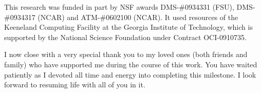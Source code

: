 \begin{acknowledgments}
This research was funded in part by NSF awards DMS-\#0934331 (FSU), DMS-\#0934317 (NCAR) and ATM-\#0602100 (NCAR). It used resources of the Keeneland Computing Facility at the Georgia Institute of Technology, which is supported by the National Science Foundation under Contract OCI-0910735.

I now close with a very special thank you to my loved ones (both friends and family) who have supported me during the course of this work. You have waited patiently as I devoted all time and energy into completing this milestone. I look forward to resuming life with all of you in it. 

%
%

\end{acknowledgments}
